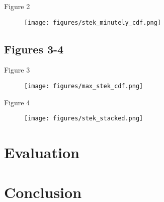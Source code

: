 Figure 2
\begin{figure}[tp]
\centering
\texttt{[image: figures/stek\_minutely\_cdf.png]}
\caption{\blindtext}
\end{figure}

\subsection{Figures 3-4}
Figure 3
\begin{figure}[tp]
\centering
\texttt{[image: figures/max\_stek\_cdf.png]}
\caption{\blindtext}
\end{figure}

Figure 4
\begin{figure}[tp]
\centering
\texttt{[image: figures/stek\_stacked.png]}
\caption{\blindtext}
\end{figure}

\section{Evaluation}

\section{Conclusion}
